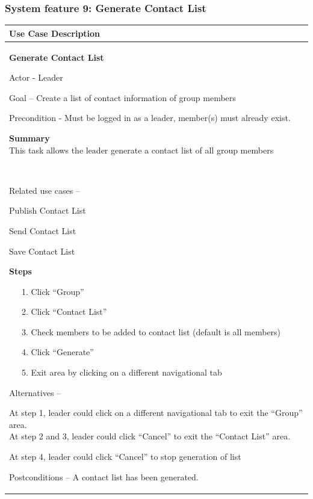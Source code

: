 \documentclass[letterpaper]{article}
\newcommand\textstyleDefaultParagraphFont[1]{#1}
\begin{document}
\bigskip

\subsubsection[System feature 9: Generate Contact List]{\rmfamily System
feature 9: Generate Contact List}
\begin{flushleft}
\tablehead{}
\begin{supertabular}{|m{6.42126in}|}
\hline
\bfseries\color{black} Use Case Description\\\hline
{\bfseries\color{black} Generate Contact List}

{\color{black} Actor - Leader}

{\color{black} Goal -- Create a list of contact information of group
members}

{\color{black} Precondition - Must be logged in as a leader, member(s)
must already exist.}

{\color{black} \textstyleDefaultParagraphFont{\textbf{Summary}}\newline
\textstyleDefaultParagraphFont{This task allows the leader
}\textstyleDefaultParagraphFont{generate a contact list of all group
members}}

~

{\color{black} Related use cases -- }

{\color{black} Publish Contact List}

{\color{black} Send Contact List}

{\color{black} Save Contact List}

{\bfseries\color{black} Steps}

{\color{black} \ \ \ 1. Click
{\textquotedblleft}Group{\textquotedblright} }

{\color{black} \ \ \ 2. Click {\textquotedblleft}Contact
List{\textquotedblright} }

{\color{black} \ \ \ 3. Check members to be added to contact list
(default is all members)}

{\color{black} \ \ \ 4. Click
{\textquotedblleft}Generate{\textquotedblright}}

{\color{black} \ \ \ 5. Exit area by clicking on a different
navigational tab}

{\color{black} Alternatives -- }

{\color{black} At step 1, leader could click on a different navigational
tab to exit the {\textquotedblleft}Group{\textquotedblright}
area.\newline
At step 2 and 3, leader could click
{\textquotedblleft}Cancel{\textquotedblright} to exit the
{\textquotedblleft}Contact List{\textquotedblright} area.}

{\color{black} At step 4, leader could click
{\textquotedblleft}Cancel{\textquotedblright} to stop generation of
list}

\color{black} Postconditions -- A contact list has been
generated.\\\hline
\end{supertabular}
\end{flushleft}
\end{document}
